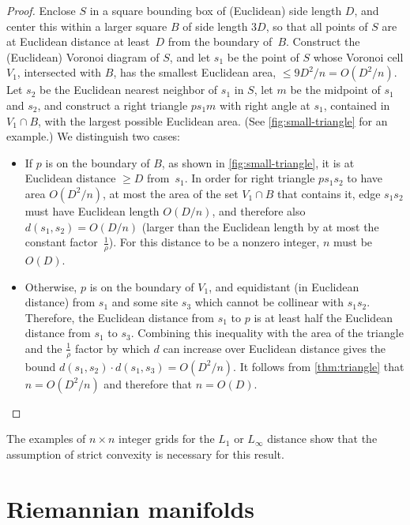 \documentclass[11pt]{article}
\theoremstyle{definition}
\begin{document}
\begin{proof}
Enclose $S$ in a square bounding box of (Euclidean) side length $D$, and center this within a larger square $B$ of side length $3D$, so that all points of $S$ are at Euclidean distance at least~$D$ from the boundary of~$B$. Construct the (Euclidean) Voronoi diagram of $S$, and let $s_1$ be the point of $S$ whose Voronoi cell $V_1$, intersected with $B$, has the smallest Euclidean area, $\le 9D^2/n=O(D^2/n)$.
Let $s_2$ be the Euclidean nearest neighbor of $s_1$ in $S$, let $m$ be the midpoint of $s_1$ and $s_2$, and construct a right triangle $ps_1m$ with right angle at $s_1$, contained in $V_1\cap B$, with the largest possible Euclidean area. (See \cref{fig:small-triangle} for an example.) We distinguish two cases:
\begin{itemize}
\item If $p$ is on the boundary of $B$, as shown in \cref{fig:small-triangle}, it is at Euclidean distance $\ge D$ from~$s_1$. In order for right triangle $ps_1s_2$ to have area $O(D^2/n)$, at most the area of the set $V_1\cap B$ that contains it, edge $s_1s_2$ must have Euclidean length $O(D/n)$, and therefore also $d(s_1,s_2)=O(D/n)$ (larger than the Euclidean length by at most the constant  factor~$\tfrac{1}{\rho}$). For this distance to be a nonzero integer, $n$ must be $O(D)$.
\item Otherwise, $p$ is on the boundary of $V_1$, and equidistant (in Euclidean distance) from $s_1$ and some site $s_3$ which cannot be collinear with $s_1s_2$. Therefore, the Euclidean distance from $s_1$ to $p$ is at least half the Euclidean distance from $s_1$ to $s_3$. Combining this inequality with the area of the triangle and the $\tfrac{1}{\rho}$ factor by which $d$ can increase over Euclidean distance gives the bound
$d(s_1,s_2)\cdot d(s_1,s_3)=O(D^2/n)$. It follows from \cref{thm:triangle} that $n=O(D^2/n)$ and therefore that $n=O(D)$.\qedhere
\end{itemize}
\end{proof}

The examples of $n\times n$ integer grids for the $L_1$ or $L_\infty$ distance show that the assumption of strict convexity is necessary for this result.

\section{Riemannian manifolds}
\label{sec:riemann}
\end{document}
